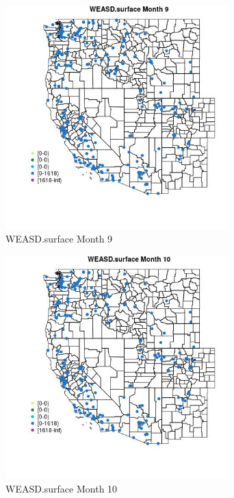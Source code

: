 \begin{figure} 
\centering  
\includegraphics[width=0.77\textwidth]{Code_Outputs/Report_ML_input_PM25_Step4_part_e_de_duplicated_aveswNAs_MapObsMo9WEASDsurface.jpg} 
\caption{\label{fig:Report_ML_input_PM25_Step4_part_e_de_duplicated_aveswNAsMapObsMo9WEASDsurface}WEASD.surface Month 9} 
\end{figure} 
 

\begin{figure} 
\centering  
\includegraphics[width=0.77\textwidth]{Code_Outputs/Report_ML_input_PM25_Step4_part_e_de_duplicated_aveswNAs_MapObsMo10WEASDsurface.jpg} 
\caption{\label{fig:Report_ML_input_PM25_Step4_part_e_de_duplicated_aveswNAsMapObsMo10WEASDsurface}WEASD.surface Month 10} 
\end{figure} 
 

